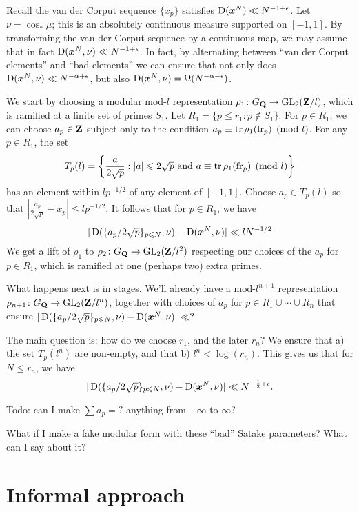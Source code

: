 Recall the van der Corput sequence $\{x_p\}$ satisfies 
$\operatorname{D}({\boldsymbol x}^N) \ll N^{-1+\epsilon}$. Let $\nu = \cos_\ast \mu$; this is an 
absolutely continuous measure supported on $[-1,1]$. By transforming the 
van der Corput sequence by a continuous map, we may assume that in fact 
$\operatorname{D}({\boldsymbol x}^N,\nu) \ll N^{-1+\epsilon}$. In fact, by alternating between 
``van der Corput elements'' and ``bad elements'' we can ensure that not 
only does $\operatorname{D}({\boldsymbol x}^N,\nu) \ll N^{-\alpha+\epsilon}$, but also 
$\operatorname{D}({\boldsymbol x}^N,\nu) = \Omega(N^{-\alpha-\epsilon})$. 

We start by choosing a modular mod-$l$ representation 
$\rho_1\colon G_{\mathbf{Q}} \to \operatorname{GL}_2(\mathbf{Z}/l)$, which is ramified at a finite set of 
primes $S_1$. Let $R_1 = \{p\leqslant r_1 : p \notin S_1\}$. For $p\in R_1$, 
we can choose $a_p\in \mathbf{Z}$ subject only to the condition 
$a_p \equiv \operatorname{tr} \rho_1(\mathrm{fr}_p)\pmod l$. For any $p\in R_1$, the set 
\[
	T_p(l) = \left\{\frac{a}{2\sqrt p} : |a| \leqslant 2\sqrt p\text{ and }a\equiv \operatorname{tr} \rho_1(\mathrm{fr}_p)\pmod l\right\}
\]
has an element within $l p^{-1/2}$ of any element of $[-1,1]$. Choose 
$a_p\in T_p(l)$ so that 
$\left|\frac{a_p}{2\sqrt p} - x_p\right| \leqslant l p^{-1/2}$. It follows 
that for $p\in R_1$, we have 
\[
	|\operatorname{D}(\{a_p/2\sqrt p\}_{p\leqslant N}, \nu) - \operatorname{D}({\boldsymbol x}^N,\nu)| \ll l N^{-1/2}
\]
We get a lift of $\rho_1$ to $\rho_2\colon G_{\mathbf{Q}} \to \operatorname{GL}_2(\mathbf{Z}/l^2)$ respecting 
our choices of the $a_p$ for $p\in R_1$, which is ramified at one (perhaps two) 
extra primes. 


What happens next is in stages. We'll already have a mod-$l^{n+1}$ 
representation $\rho_{n+1}\colon G_{\mathbf{Q}} \to \operatorname{GL}_2(\mathbf{Z}/l^n)$, together with 
choices of $a_p$ for $p\in R_1\cup \cdots \cup R_n$ that ensure 
$|\operatorname{D}(\{a_p / 2\sqrt p\}_{p\leqslant N}, \nu) - \operatorname{D}({\boldsymbol x}^N,\nu)| \ll ?$


The main question is: how do we choose $r_1$, and the later $r_n$? We ensure 
that a) the set $T_p(l^n)$ are non-empty, and that b) $l^n < \log(r_n)$. This 
gives us that for $N\leqslant r_n$, we have 
\[
	|\operatorname{D}(\{a_p / 2\sqrt p\}_{p\leqslant N}, \nu) - \operatorname{D}({\boldsymbol x}^N,\nu)| \ll N^{-\frac 1 2+\epsilon} .
\]

Todo: can I make $\sum a_p = ?$ anything from $-\infty$ to $\infty$?

What if I make a fake modular form with these ``bad'' Satake parameters? What 
can I say about it?





\section{Informal approach}

